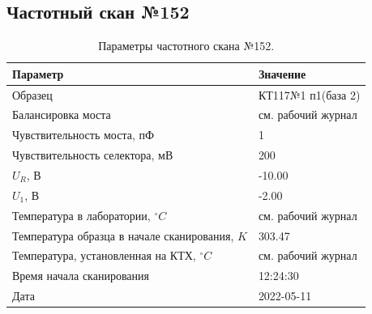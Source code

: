 \subsection{Частотный скан №152}
\begin{table}[!ht]
    \centering
    \caption{Параметры частотного скана №152.}
    \begin{tabular}{|l|l|}
        \hline
        Параметр                                       & Значение                  \\ \hline
        Образец                                        & КТ117№1 п1(база 2)        \\ \hline
        Балансировка моста                             & см. рабочий журнал        \\ \hline
        Чувствительность моста, пФ                     & 1                         \\ \hline
        Чувствительность селектора, мВ                 & 200                       \\ \hline
        $U_R$, В                                       & -10.00                    \\ \hline
        $U_1$, В                                       & -2.00                     \\ \hline
        Температура в лаборатории, $^\circ C$          & см. рабочий журнал        \\ \hline
        Температура образца в начале сканирования, $K$ & 303.47                    \\ \hline
        Температура, установленная на КТХ, $^\circ C$  & см. рабочий журнал        \\ \hline
        Время начала сканирования                      & 12:24:30                  \\ \hline
        Дата                                           & 2022-05-11                \\ \hline
    \end{tabular}
    \label{table:frequency_scan_152}
\end{table}

